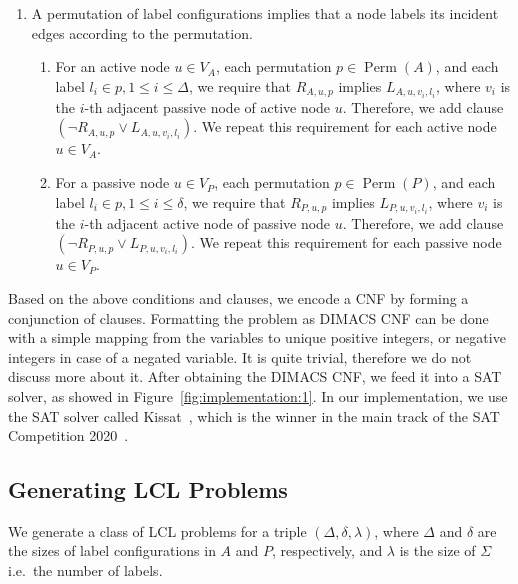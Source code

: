 \begin{enumerate}
\item
  A permutation of label configurations implies that a node labels its incident edges according to the permutation.
  \begin{enumerate}
  \item
    For an active node $u \in V_A$, each permutation $p \in \operatorname{Perm}(A)$, and each label $l_i \in p, 1 \leq i \leq \Delta$, we require that $R_{A, u, p}$ implies $L_{A,u,v_i,l_i}$, where $v_i$ is the $i$-th adjacent passive node of active node $u$.
    Therefore, we add clause $(\neg R_{A, u, p} \lor L_{A,u,v_i,l_i})$.
    We repeat this requirement for each active node $u \in V_A$.
    \label{enu:sat_conditions:3a}
  \item
    For a passive node $u \in V_P$, each permutation $p \in \operatorname{Perm}(P)$, and each label $l_i \in p, 1 \leq i \leq \delta$, we require that $R_{P, u, p}$ implies $L_{P,u,v_i,l_i}$, where $v_i$ is the $i$-th adjacent active node of passive node $u$.
    Therefore, we add clause $(\neg R_{P, u, p} \lor L_{P,u,v_i,l_i})$.
    We repeat this requirement for each passive node $u \in V_P$.
    \label{enu:sat_conditions:3b}
  \end{enumerate}
\end{enumerate}

Based on the above conditions and clauses, we encode a CNF by forming a conjunction of clauses.
Formatting the problem as DIMACS CNF can be done with a simple mapping from the variables to unique positive integers, or negative integers in case of a negated variable.
It is quite trivial, therefore we do not discuss more about it.
After obtaining the DIMACS CNF, we feed it into a SAT solver, as showed in Figure~\ref{fig:implementation:1}.
In our implementation, we use the SAT solver called Kissat~\cite{BiereFazekasFleuryHeisinger-SAT-Competition-2020-solvers, Kissat}, which is the winner in the main track of the SAT Competition 2020~\cite{SatCompetition2020}.


\subsection{Generating LCL Problems} \label{sec:implementation:generating_lcl_problems}

We generate a class of LCL problems for a triple $(\Delta, \delta, \lambda)$, where $\Delta$ and $\delta$ are the sizes of label configurations in $A$ and $P$, respectively, and $\lambda$ is the size of $\Sigma$ i.e.\ the number of labels.

